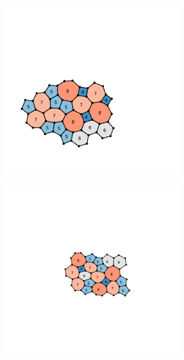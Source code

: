 \begin{figure}[h]
     \begin{subfigure}[b]{0.25\textwidth}
         \centering
         \includegraphics[width=\textwidth]{./figures/introduction/zach_orig.pdf}
         \caption{}
         \label{fig:zach_orig}
     \end{subfigure}
     \hspace{1cm}
     \begin{subfigure}[b]{0.25\textwidth}
         \centering
         \includegraphics[width=\textwidth]{./figures/introduction/zach_high.pdf}
         \caption{}
         \label{fig:zach_high}
     \end{subfigure}
     \hspace{1cm}
     

\end{figure}
